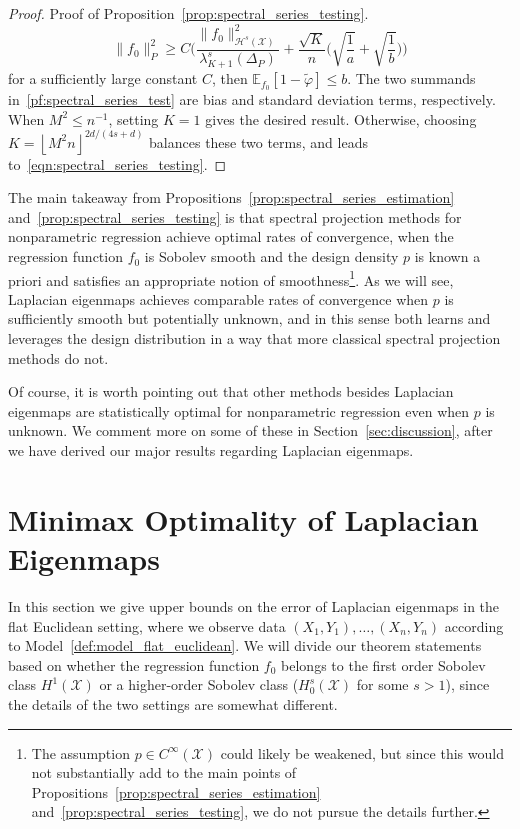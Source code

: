 \documentclass[aos]{imsart}
\theoremstyle{plain}
\theoremstyle{definition}
\theoremstyle{remark}
\newcommand{\Ebb}{\mathbb{E}}
\newcommand{\wt}[1]{\widetilde{#1}}
\newcommand{\mc}[1]{\mathcal{#1}}
\newcommand{\floor}[1]{\left\lfloor #1 \right\rfloor}
\newcommand{\1}{\mathbf{1}}
\begin{document}
\begin{proof}{Proof of Proposition~\ref{prop:spectral_series_testing}.}
\begin{equation}
\label{pf:spectral_series_test}
\|f_0\|_P^2 \geq C\Biggl(\frac{\|f_0\|_{\mc{H}^s(\mc{X})}^2}{\lambda_{K + 1}^s(\Delta_{P})} + \frac{\sqrt{K}}{n}\biggl(\sqrt{\frac{1}{a}} + \sqrt{\frac{1}{b}}\biggr)\Biggr)
\end{equation}
for a sufficiently large constant $C$, then $\Ebb_{f_0}[1 - \wt{\varphi}] \leq b$. The two summands in~\eqref{pf:spectral_series_test} are bias and standard deviation terms, respectively. When $M^2 \leq n^{-1}$, setting $K = 1$ gives the desired result. Otherwise, choosing $K = \floor{M^2n}^{2d/(4s + d)}$ balances these two terms, and leads to~\eqref{eqn:spectral_series_testing}.
\end{proof}

The main takeaway from Propositions~\ref{prop:spectral_series_estimation} and~\ref{prop:spectral_series_testing} is that spectral projection methods for nonparametric regression achieve optimal rates of convergence, when the regression function $f_0$ is Sobolev smooth and the design density $p$ is known a priori and satisfies an appropriate notion of smoothness\footnote{The assumption $p \in C^{\infty}(\mc{X})$ could likely be weakened, but since this would not substantially add to the main points of Propositions~\ref{prop:spectral_series_estimation} and~\ref{prop:spectral_series_testing}, we do not pursue the details further.}. As we will see, Laplacian eigenmaps achieves comparable rates of convergence when $p$ is sufficiently smooth but potentially unknown, and in this sense both learns and leverages the design distribution in a way that more classical spectral projection methods do not.

Of course, it is worth pointing out that other methods besides Laplacian eigenmaps are statistically optimal for nonparametric regression even when $p$ is unknown. We comment more on some of these in Section~\ref{sec:discussion}, after we have derived our major results regarding Laplacian eigenmaps.

\section{Minimax Optimality of Laplacian Eigenmaps}
\label{sec:minimax_optimal_laplacian_eigenmaps}

In this section we give upper bounds on the error of Laplacian eigenmaps in the flat Euclidean setting, where we observe data $(X_1,Y_1),\ldots,(X_n,Y_n)$ according to Model~\ref{def:model_flat_euclidean}. We will divide our theorem statements based on whether the regression function $f_0$ belongs to the first order Sobolev class $H^1(\mc{X})$ or a higher-order Sobolev class ($H_0^{s}(\mc{X})$ for some $s > 1$), since the details of the two settings are somewhat different.
\end{document}

